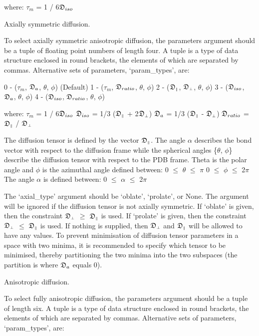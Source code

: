 where:
    $\tau_m$ = 1 / 6$\mathfrak{D}_{iso}$


Axially symmetric diffusion.

To select axially symmetric anisotropic diffusion, the parameters argument should be a tuple
of floating point numbers of length four.  A tuple is a type of data structure enclosed in
round brackets, the elements of which are separated by commas.  Alternative sets of
parameters, `param\_types', are:

    0 - ($\tau_m$, $\mathfrak{D}_a$, $\theta$, $\phi$)   (Default)
    1 - ($\tau_m$, $\mathfrak{D}_{ratio}$, $\theta$, $\phi$)
    2 - ($\mathfrak{D}_{\scriptscriptstyle \parallel}$, $\mathfrak{D}_{\scriptscriptstyle \perp}$, $\theta$, $\phi$)
    3 - ($\mathfrak{D}_{iso}$, $\mathfrak{D}_a$, $\theta$, $\phi$)
    4 - ($\mathfrak{D}_{iso}$, $\mathfrak{D}_{ratio}$, $\theta$, $\phi$)

where:
    $\tau_m$ = 1 / 6$\mathfrak{D}_{iso}$
    $\mathfrak{D}_{iso}$ = 1/3 ($\mathfrak{D}_{\scriptscriptstyle \parallel}$ + 2$\mathfrak{D}_{\scriptscriptstyle \perp}$)
    $\mathfrak{D}_a$ = 1/3 ($\mathfrak{D}_{\scriptscriptstyle \parallel}$ - $\mathfrak{D}_{\scriptscriptstyle \perp}$)
    $\mathfrak{D}_{ratio}$ = $\mathfrak{D}_{\scriptscriptstyle \parallel}$ / $\mathfrak{D}_{\scriptscriptstyle \perp}$

The diffusion tensor is defined by the vector $\mathfrak{D}_{\scriptscriptstyle \parallel}$.  The angle $\alpha$ describes the bond
vector with respect to the diffusion frame while the spherical angles \{$\theta$, $\phi$\} describe
the diffusion tensor with respect to the PDB frame.  Theta is the polar angle and $\phi$ is the
azimuthal angle defined between:
    0 $\le$ $\theta$ $\le$ $\pi$
    0 $\le$ $\phi$ $\le$ 2$\pi$
The angle $\alpha$ is defined between:
    0 $\le$ $\alpha$ $\le$ 2$\pi$

The `axial\_type' argument should be `oblate', `prolate', or None.  The argument will be
ignored if the diffusion tensor is not axially symmetric.  If `oblate' is given, then the
constraint $\mathfrak{D}_{\scriptscriptstyle \perp}$ $\ge$ $\mathfrak{D}_{\scriptscriptstyle \parallel}$ is used.  If `prolate' is given, then the constraint $\mathfrak{D}_{\scriptscriptstyle \perp}$ $\le$ $\mathfrak{D}_{\scriptscriptstyle \parallel}$ is
used.  If nothing is supplied, then $\mathfrak{D}_{\scriptscriptstyle \perp}$ and $\mathfrak{D}_{\scriptscriptstyle \parallel}$ will be allowed to have any values.  To
prevent minimisation of diffusion tensor parameters in a space with two minima, it is
recommended to specify which tensor to be minimised, thereby partitioning the two minima
into the two subspaces (the partition is where $\mathfrak{D}_a$ equals 0).


Anisotropic diffusion.

To select fully anisotropic diffusion, the parameters argument should be a tuple of length
six.  A tuple is a type of data structure enclosed in round brackets, the elements of which
are separated by commas.  Alternative sets of parameters, `param\_types', are:

